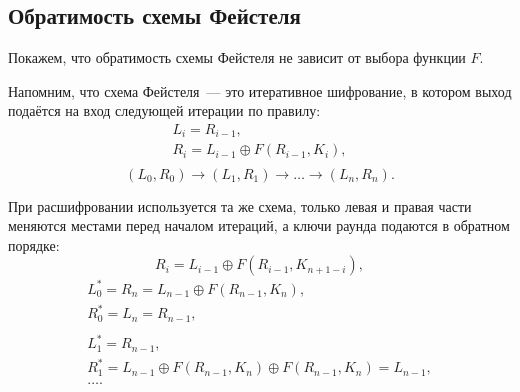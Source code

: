 \subsection{Обратимость схемы Фейстеля}

Покажем, что обратимость схемы Фейстеля не зависит от выбора функции $F$.

Напомним, что схема Фейстеля~--- это итеративное шифрование, в котором выход подаётся на вход следующей итерации по правилу:
\[ \begin{array}{l}
    L_i = R_{i-1}, \\
    R_i = L_{i-1} \oplus F(R_{i-1}, K_i), \\
\end{array} \]
\[
    (L_0,R_0) \rightarrow (L_1,R_1) \rightarrow \ldots \rightarrow (L_n,R_n).
\]

При расшифровании используется та же схема, только левая и правая части меняются местами перед началом итераций, а ключи раунда подаются в обратном порядке:
    \[ R_i = L_{i-1} \oplus F(R_{i-1}, K_{n+1-i}), \]
\[ \begin{array}{l}
    L_0^* = R_n = L_{n-1} \oplus F(R_{n-1}, K_n), \\
    R_0^* = L_n = R_{n-1}, \\
    \\
    L_1^* = R_{n-1}, \\
    R_1^* = L_{n-1} \oplus F(R_{n-1}, K_n) \oplus F(R_{n-1}, K_n) = L_{n-1}, \\
    \dots.
\end{array} \]
